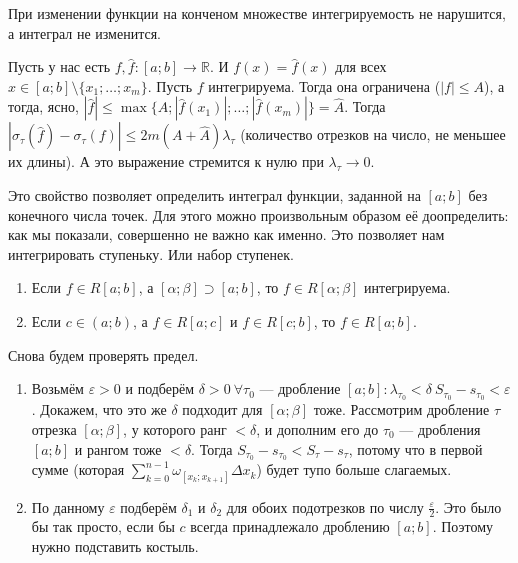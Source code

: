 \documentclass{article}
\begin{document}
\begin{itemize}
\begin{Proof}
        \end{Proof}
        \thm При изменении функции на конченом множестве интегрируемость не нарушится, а интеграл не изменится.
        \begin{Proof}
            Пусть у нас есть $f,\hat f\colon[a;b]\to\mathbb R$. И $f(x)=\hat f(x)$ для всех $x\in[a;b]\setminus\{x_1;\ldots;x_m\}$. Пусть $f$ интегрируема. Тогда она ограничена ($|f|\leqslant A$), а тогда, ясно, $|\hat f|\leqslant\max\{A;|\hat f(x_1)|;\ldots;|\hat f(x_m)|\}=\hat A$. Тогда $|\sigma_\tau(\hat f)-\sigma_\tau(f)|\leqslant 2m(A+\hat A)\lambda_\tau$ (количество отрезков на число, не меньшее их длины). А это выражение стремится к нулю при $\lambda_\tau\to0$.
        \end{Proof}
        \begin{Comment}
            Это свойство позволяет определить интеграл функции, заданной на $[a;b]$ без конечного числа точек. Для этого можно произвольным образом её доопределить: как мы показали, совершенно не важно как именно. Это позволяет нам интегрировать ступеньку. Или набор ступенек.
        \end{Comment}
        \thm {}
        \begin{enumerate}
            \item Если $f\in R[a;b]$, а $[\alpha;\beta]\supset[a;b]$, то $f\in R[\alpha;\beta]$ интегрируема.
            \item Если $c\in(a;b)$, а $f\in R[a;c]$ и $f\in R[c;b]$, то $f\in R[a;b]$.
        \end{enumerate}
        \begin{Proof}
            Снова будем проверять предел.
            \begin{enumerate}
                \item Возьмём $\varepsilon>0$ и подберём $\delta>0~\forall\tau_0\text{ --- дробление }[a;b]:\lambda_{\tau_0}<\delta~S_{\tau_0}-s_{\tau_0}<\varepsilon$. Докажем, что это же $\delta$ подходит для $[\alpha;\beta]$ тоже. Рассмотрим дробление $\tau$ отрезка $[\alpha;\beta]$, у которого ранг $<\delta$, и дополним его до $\tau_0$ --- дробления $[a;b]$ и рангом тоже $<\delta$. Тогда $S_{\tau_0}-s_{\tau_0}<S_{\tau}-s_{\tau}$, потому что в первой сумме (которая $\sum\limits_{k=0}^{n-1}\omega_{[x_k;x_{k+1}]}\Delta x_k$) будет тупо больше слагаемых.
                \item По данному $\varepsilon$ подберём $\delta_1$ и $\delta_2$ для обоих подотрезков по числу $\frac\varepsilon2$. Это было бы так просто, если бы $c$ всегда принадлежало дроблению $[a;b]$. Поэтому нужно подставить костыль.\\

\end{enumerate}
\end{Proof}
\end{itemize}
\end{document}
